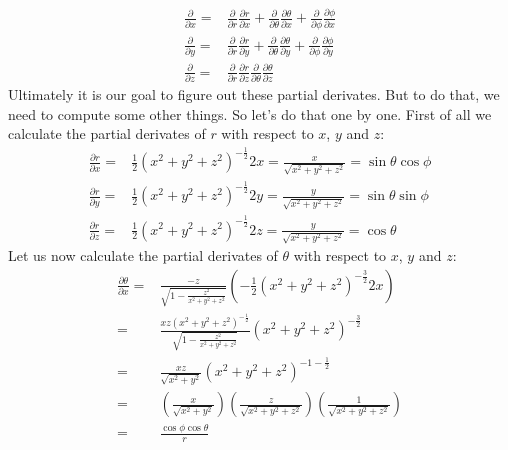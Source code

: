                 \begin{align}
                    \frac{\partial}{\partial x} = & \frac{\partial}{\partial r}\frac{\partial r}{\partial x}
                                                  + \frac{\partial}{\partial \theta}\frac{\partial \theta}{\partial x}
                                                  + \frac{\partial}{\partial \phi}\frac{\partial \phi}{\partial x} \\
                    \frac{\partial}{\partial y} = & \frac{\partial}{\partial r}\frac{\partial r}{\partial y} 
                                                  + \frac{\partial}{\partial \theta}\frac{\partial \theta}{\partial y}
                                                  + \frac{\partial}{\partial \phi}\frac{\partial \phi}{\partial y} \\
                    \frac{\partial}{\partial z} = & \frac{\partial}{\partial r}\frac{\partial r}{\partial z} 
                                                    \frac{\partial}{\partial \theta}\frac{\partial \theta}{\partial z}
                \end{align}
                Ultimately it is our goal to figure out these partial derivates. But to do that, we need to compute some other things. So let's do that one by one.
                First of all we calculate the partial derivates of $r$ with respect to $x$, $y$ and $z$:
                \begin{align*}
                    \frac{\partial r}{\partial x} = & \frac{1}{2}\left(x^2 + y^2 + z^2\right)^{-\frac{1}{2}}2x = \frac{x}{\sqrt{x^2 + y^2 + z^2}} = \sin\theta\cos\phi \\
                    \frac{\partial r}{\partial y} = & \frac{1}{2}\left(x^2 + y^2 + z^2\right)^{-\frac{1}{2}}2y = \frac{y}{\sqrt{x^2 + y^2 + z^2}} = \sin\theta\sin\phi \\
                    \frac{\partial r}{\partial z} = & \frac{1}{2}\left(x^2 + y^2 + z^2\right)^{-\frac{1}{2}}2z = \frac{y}{\sqrt{x^2 + y^2 + z^2}} = \cos\theta 
                \end{align*}
                Let us now calculate the partial derivates of $\theta$ with respect to $x$, $y$ and $z$:
                \begin{align*}
                     \frac{\partial\theta}{\partial x} = & \frac{-z}{\sqrt{1-\frac{z^2}{x^2 + y^2 + z^2}}}\left(-\frac{1}{2}\left(x^2 + y^2 + z^2\right)^{-\frac{3}{2}}2x\right) \\
                     = & \frac{xz\left(x^2+y^2+z^2\right)^{-\frac{1}{2}}}{\sqrt{1-\frac{z^2}{x^2 + y^2 + z^2}}}\left(x^2 + y^2 + z^2\right)^{-\frac{3}{2}} \\
                     = & \frac{xz}{\sqrt{x^2 + y^2}}\left(x^2 + y^2 + z^2\right)^{-1-\frac{1}{2}} \\
                     = & \left(\frac{x}{\sqrt{x^2 + y^2}}\right)\left(\frac{z}{\sqrt{x^2 + y^2 + z^2}}\right)\left(\frac{1}{\sqrt{x^2 + y^2 + z^2}}\right) \\
                     = & \frac{\cos\phi\cos\theta}{r}
                \end{align*}
